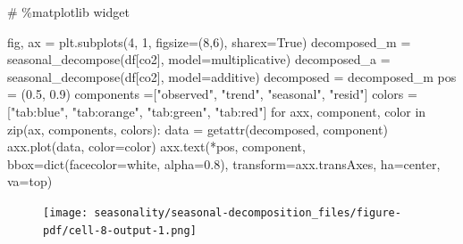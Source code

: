 \documentclass[
  letterpaper,
  DIV=11,
  numbers=noendperiod,
  oneside]{scrreprt}
\newenvironment{Shaded}{\begin{snugshade}}{\end{snugshade}}
\newcommand{\BuiltInTok}[1]{\textcolor[rgb]{0.00,0.23,0.31}{#1}}
\newcommand{\CommentTok}[1]{\textcolor[rgb]{0.37,0.37,0.37}{#1}}
\newcommand{\ControlFlowTok}[1]{\textcolor[rgb]{0.00,0.23,0.31}{#1}}
\newcommand{\DecValTok}[1]{\textcolor[rgb]{0.68,0.00,0.00}{#1}}
\newcommand{\FloatTok}[1]{\textcolor[rgb]{0.68,0.00,0.00}{#1}}
\newcommand{\KeywordTok}[1]{\textcolor[rgb]{0.00,0.23,0.31}{#1}}
\newcommand{\NormalTok}[1]{\textcolor[rgb]{0.00,0.23,0.31}{#1}}
\newcommand{\OperatorTok}[1]{\textcolor[rgb]{0.37,0.37,0.37}{#1}}
\newcommand{\StringTok}[1]{\textcolor[rgb]{0.13,0.47,0.30}{#1}}
\newcommand{\VariableTok}[1]{\textcolor[rgb]{0.07,0.07,0.07}{#1}}
\begin{document}
\begin{Shaded}
\begin{Highlighting}[]
\CommentTok{\# \%matplotlib widget}

\NormalTok{fig, ax }\OperatorTok{=}\NormalTok{ plt.subplots(}\DecValTok{4}\NormalTok{, }\DecValTok{1}\NormalTok{, figsize}\OperatorTok{=}\NormalTok{(}\DecValTok{8}\NormalTok{,}\DecValTok{6}\NormalTok{), sharex}\OperatorTok{=}\VariableTok{True}\NormalTok{)}
\NormalTok{decomposed\_m }\OperatorTok{=}\NormalTok{ seasonal\_decompose(df[}\StringTok{\textquotesingle{}co2\textquotesingle{}}\NormalTok{], model}\OperatorTok{=}\StringTok{\textquotesingle{}multiplicative\textquotesingle{}}\NormalTok{)}
\NormalTok{decomposed\_a }\OperatorTok{=}\NormalTok{ seasonal\_decompose(df[}\StringTok{\textquotesingle{}co2\textquotesingle{}}\NormalTok{], model}\OperatorTok{=}\StringTok{\textquotesingle{}additive\textquotesingle{}}\NormalTok{)}
\NormalTok{decomposed }\OperatorTok{=}\NormalTok{ decomposed\_m}
\NormalTok{pos }\OperatorTok{=}\NormalTok{ (}\FloatTok{0.5}\NormalTok{, }\FloatTok{0.9}\NormalTok{)}
\NormalTok{components }\OperatorTok{=}\NormalTok{[}\StringTok{"observed"}\NormalTok{, }\StringTok{"trend"}\NormalTok{, }\StringTok{"seasonal"}\NormalTok{, }\StringTok{"resid"}\NormalTok{]}
\NormalTok{colors }\OperatorTok{=}\NormalTok{ [}\StringTok{"tab:blue"}\NormalTok{, }\StringTok{"tab:orange"}\NormalTok{, }\StringTok{"tab:green"}\NormalTok{, }\StringTok{"tab:red"}\NormalTok{]}
\ControlFlowTok{for}\NormalTok{ axx, component, color }\KeywordTok{in} \BuiltInTok{zip}\NormalTok{(ax, components, colors):}
\NormalTok{    data }\OperatorTok{=} \BuiltInTok{getattr}\NormalTok{(decomposed, component)}
\NormalTok{    axx.plot(data, color}\OperatorTok{=}\NormalTok{color)}
\NormalTok{    axx.text(}\OperatorTok{*}\NormalTok{pos, component, bbox}\OperatorTok{=}\BuiltInTok{dict}\NormalTok{(facecolor}\OperatorTok{=}\StringTok{\textquotesingle{}white\textquotesingle{}}\NormalTok{, alpha}\OperatorTok{=}\FloatTok{0.8}\NormalTok{),}
\NormalTok{           transform}\OperatorTok{=}\NormalTok{axx.transAxes, ha}\OperatorTok{=}\StringTok{\textquotesingle{}center\textquotesingle{}}\NormalTok{, va}\OperatorTok{=}\StringTok{\textquotesingle{}top\textquotesingle{}}\NormalTok{)}
\end{Highlighting}
\end{Shaded}

\begin{figure}[H]

{\centering \texttt{[image: seasonality/seasonal-decomposition\_files/figure-pdf/cell-8-output-1.png]}

}

\end{figure}
\end{document}
